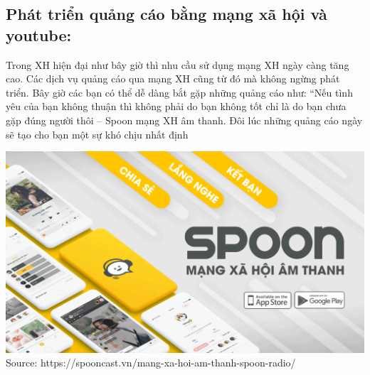 \documentclass[13pt,a4paper]{article}
\begin{document}
    \subsection{Phát triển quảng cáo bằng mạng xã hội và youtube:}
    Trong XH hiện đại như bây giờ thì nhu cầu sử dụng mạng XH ngày càng tăng cao. Các dịch vụ quảng cáo qua mạng XH cũng từ đó mà không ngừng phát triển.
    Bây giờ các bạn có thể dễ dàng bắt gặp những quảng cáo như: “Nếu tình yêu của bạn không thuận thì không phải do bạn không tốt chỉ là do bạn chưa gặp đúng người thôi – Spoon mạng XH âm thanh. Đôi lúc những quảng cáo ngày sẽ tạo cho bạn một sự khó chịu nhất định
     \\\begin{center}
    \includegraphics[scale=0.25]{images/spoon.png} \\
    \fontsize{10pt}{1.2pt}\selectfont
    Source: https://spooncast.vn/mang-xa-hoi-am-thanh-spoon-radio/
    \end{center}
    
\end{document}
